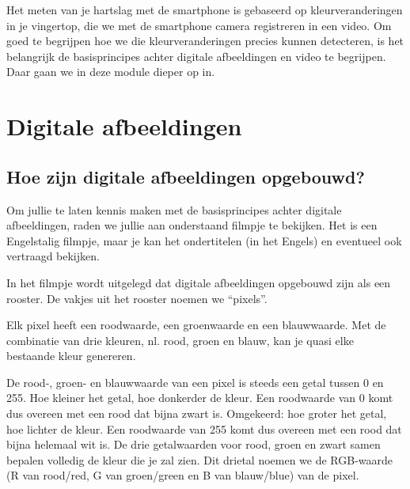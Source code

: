 \label{sec:digafbvid}

\begin{samenvatting}
Het meten van je hartslag met de smartphone is gebaseerd op kleurveranderingen in je vingertop, die we met de smartphone camera registreren in een video. Om goed te begrijpen hoe we die kleurveranderingen precies kunnen detecteren, is het belangrijk de basisprincipes achter digitale afbeeldingen en video te begrijpen. Daar gaan we in deze module dieper op in.
\end{samenvatting}
%

\section{Digitale afbeeldingen}
\label{sec:Mod3_Sec1}
%

\subsection{Hoe zijn digitale afbeeldingen opgebouwd?}

Om jullie te laten kennis maken met de basisprincipes achter digitale afbeeldingen, raden we jullie aan onderstaand filmpje te bekijken. Het is een Engelstalig filmpje, maar je kan het ondertitelen (in het Engels) en eventueel ook vertraagd bekijken.


In het filmpje wordt uitgelegd dat digitale afbeeldingen opgebouwd zijn als een rooster. De vakjes uit het rooster noemen we \textquotedblleft pixels\textquotedblright. 


Elk pixel heeft een roodwaarde, een groenwaarde en een blauwwaarde. Met de combinatie van drie kleuren, nl. rood, groen en blauw, kan je quasi elke bestaande kleur genereren. 

De rood-, groen- en blauwwaarde van een pixel is steeds een getal tussen 0 en 255. Hoe kleiner het getal, hoe donkerder de kleur. Een roodwaarde van 0 komt dus overeen met een rood dat bijna zwart is. Omgekeerd: hoe groter het getal, hoe lichter de kleur. Een roodwaarde van 255 komt dus overeen met een rood dat bijna helemaal wit is. De drie getalwaarden voor rood, groen en zwart samen bepalen volledig de kleur die je zal zien. Dit drietal noemen we de RGB-waarde (R van rood/red, G van groen/green en B van blauw/blue) van de pixel.

